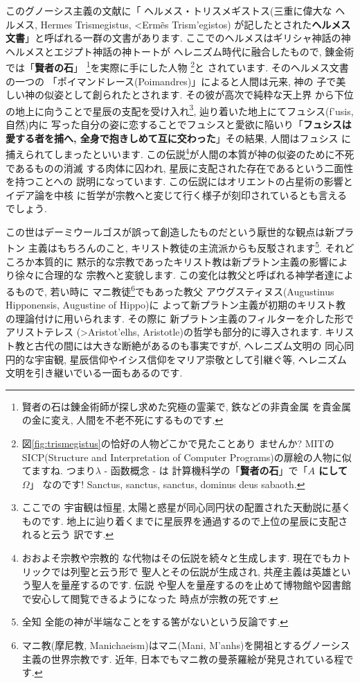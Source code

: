このグノーシス主義の文献に「 ヘルメス・トリスメギストス(三重に偉大な
ヘルメス, Hermes Trismegistus, \textgreek{<Erm\~es Trism'egistos})
が記したとされた\textbf{ヘルメス文書}」と呼ばれる一群の文書があります.
 ここでのヘルメスはギリシャ神話の神ヘルメスとエジプト神話の神トートが
ヘレニズム時代に融合したもので, 錬金術では「\textbf{賢者の石}」
\footnote{賢者の石は錬金術師が探し求めた究極の霊薬で, 鉄などの非貴金属
を貴金属の金に変え, 人間を不老不死にするものです.}を実際に手にした人物
\footnote{図\ref{fig:trismegistus}の恰好の人物どこかで見たことあり
ませんか? MITのSICP(Structure and Interpretation of Computer
 Programs)の扉絵の人物に似てますね. つまり$\lambda$ - 函数概念 - は
計算機科学の「\textbf{賢者の石}」で「\textbf{$A$ にして $\Omega$}」
なのです! Sanctus, sanctus, sanctus, dominus deus sabaoth.}と
されています\cite{錬金術}. そのヘルメス文書の一つの
「ポイマンドレース(Poimandres)」\cite{柴田}によると人間は元来, 神の
子で美しい神の似姿として創られたとされます. その彼が高次で純粋な天上界
から下位の地上に向うことで星辰の支配を受け入れ\footnote{ここでの
宇宙観は恒星, 太陽と惑星が同心同円状の配置された天動説に基くものです.
 地上に辿り着くまでに星辰界を通過するので上位の星辰に支配されると云う
訳です.}, 辿り着いた地上にてフュシス(\textgreek{f'usis}, 自然)内に
写った自分の姿に恋することでフュシスと愛欲に陥いり「\textbf{フュシスは
愛する者を捕へ, 全身で抱きしめて互に交わった}」その結果, 人間はフュシス
に捕えられてしまったといいます. この伝説\footnote{おおよそ宗教や宗教的
な代物はその伝説を続々と生成します. 現在でもカトリックでは列聖と云う形で
聖人とその伝説が生成され, 共産主義は英雄という聖人を量産するのです. 伝説
や聖人を量産するのを止めて博物館や図書館で安心して閲覧できるようになった
時点が宗教の死です.}が人間の本質が神の似姿のために不死であるものの消滅
する肉体に囚われ, 星辰に支配された存在であるという二面性を持つことへの
説明になっています. この伝説にはオリエントの占星術の影響とイデア論を中核
に哲学が宗教へと変じて行く様子が刻印されているとも言えるでしょう.
\newline

この世はデーミウールゴスが誤って創造したものだという厭世的な観点は新プラトン
主義はもちろんのこと, キリスト教徒の主流派からも反駁されます\footnote{全知
全能の神が半端なことをする筈がないという反論です.}. それどころか本質的に
黙示的な宗教であったキリスト教は新プラトン主義の影響により徐々に合理的な
宗教へと変貌します. この変化は教父と呼ばれる神学者達によるもので, 若い時に
マニ教徒\footnote{マニ教(摩尼教, Manichaeism)はマニ(Mani,
 \textgreek{M'anhs})を開祖とするグノーシス主義の世界宗教です. 近年,
 日本でもマニ教の曼荼羅絵が発見されている程です.}でもあった教父
 アウグスティヌス(Augustinus Hipponensis, Augustine of Hippo)に
よって新プラトン主義が初期のキリスト教の理論付けに用いられます. その際に
新プラトン主義のフィルターを介した形でアリストテレス
(\textgreek{>Aristot'elhs}, Aristotle)の哲学も部分的に導入されます.
 キリスト教と古代の間には大きな断絶があるのも事実ですが, ヘレニズム文明の
同心同円的な宇宙観, 星辰信仰やイシス信仰をマリア崇敬として引継ぐ等,
 ヘレニズム文明を引き継いでいる一面もあるのです.
\newline


